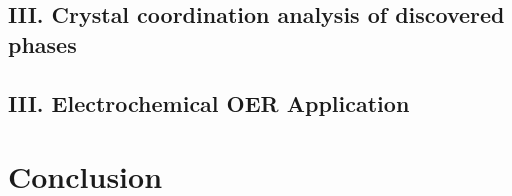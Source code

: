 \documentclass[a6paper,journal=jacsat,manuscript=article]{achemso}  %
\begin{document}
  \subsection{III. Crystal coordination analysis of discovered phases}
  

  \subsection{III. Electrochemical OER Application}
  

\section{Conclusion}


\begin{acknowledgement}

\end{acknowledgement}

\clearpage
\renewcommand{\thefigure}{S\arabic{figure}}
\setcounter{figure}{0}
\renewcommand{\thetable}{S\arabic{table}}
\setcounter{table}{0}

\begin{suppinfo}

\end{suppinfo}


\end{document}
